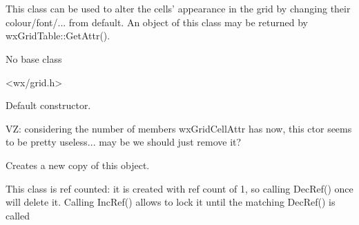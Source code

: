 %
%

\section{}\label{wxgridcellattr}

This class can be used to alter the cells' appearance in
the grid by changing their colour/font/... from default. An object of this
class may be returned by wxGridTable::GetAttr().


No base class


<wx/grid.h>


\label{wxgridcellattrwxgridcellattr}


Default constructor.
            

VZ: considering the number of members wxGridCellAttr has now, this ctor
seems to be pretty useless... may be we should just remove it?

\label{wxgridcellattrclone}


Creates a new copy of this object.

\label{wxgridcellattrincref}


This class is ref counted: it is created with ref count of 1, so
calling DecRef() once will delete it. Calling IncRef() allows to lock
it until the matching DecRef() is called

\label{wxgridcellattrdecref}


\label{wxgridcellattrsettextcolour}


